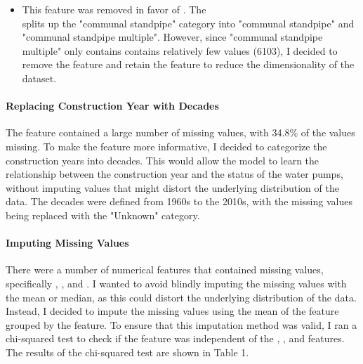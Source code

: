 \documentclass{article}
\begin{document}
\begin{itemize}
  \item {} This feature was removed in favor of . The \\  splits up the "communal standpipe" category into "communal standpipe" and "communal standpipe multiple". However, since "communal standpipe multiple" only contains contains relatively few values (6103), I decided to remove the  feature and retain the  feature to reduce the dimensionality of the dataset.
\end{itemize}

\paragraph{Replacing Construction Year with Decades}
The  feature contained a large number of missing values, with 34.8\% of the values missing. To make the feature more informative, I decided to categorize the construction years into decades. This would allow the model to learn the relationship between the construction year and the status of the water pumps, without imputing values that might distort the underlying distribution of the data. The decades were defined from 1960s to the 2010s, with the missing values being replaced with the "Unknown" category.

\paragraph{Imputing Missing Values}
There were a number of numerical features that contained missing values, specifically , ,  and . I wanted to avoid blindly imputing the missing values with the mean or median, as this could distort the underlying distribution of the data. Instead, I decided to impute the missing values using the mean of the feature grouped by the  feature. To ensure that this imputation method was valid, I ran a chi-squared test to check if the  feature was independent of the , ,  and  features. The results of the chi-squared test are shown in Table 1.
\end{document}
